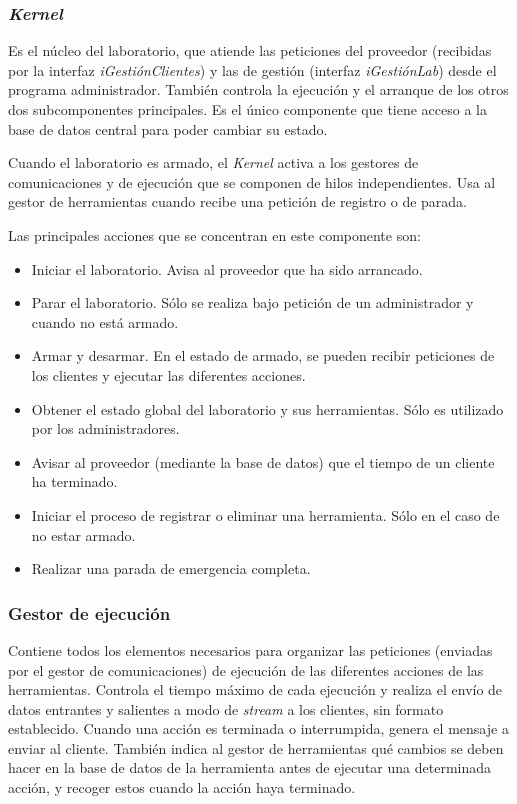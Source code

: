 \subsubsection{\emph{Kernel}}
Es el núcleo del laboratorio, que atiende las peticiones del proveedor 
(recibidas por la interfaz \emph{iGestiónClientes}) y las de gestión 
(interfaz \emph{iGestiónLab}) desde el programa administrador. 
También controla la ejecución y el arranque de los otros dos 
subcomponentes principales. Es el único componente que tiene acceso a 
la base de datos central para poder cambiar su estado.

Cuando el laboratorio es armado, el \emph{Kernel} activa a los 
gestores de comunicaciones y de ejecución que se componen de hilos 
independientes. Usa al gestor de herramientas cuando recibe una 
petición de registro o de parada.

Las principales acciones que se concentran en este componente son:
\begin{itemize}
\item Iniciar el laboratorio. Avisa al proveedor que ha sido arrancado.
\item Parar el laboratorio. Sólo se realiza bajo petición de un 
administrador y cuando no está armado.
\item Armar y desarmar. En el estado de armado, se pueden recibir 
peticiones de los clientes y ejecutar las diferentes acciones.
\item Obtener el estado global del laboratorio y sus herramientas. 
Sólo es utilizado por los administradores.
\item Avisar al proveedor (mediante la base de datos) que el tiempo de 
un cliente ha terminado.
\item Iniciar el proceso de registrar o eliminar una herramienta. Sólo 
en el caso de no estar armado.
\item Realizar una parada de emergencia completa.
\end{itemize}

\subsubsection{Gestor de ejecución}
Contiene todos los elementos necesarios para organizar las peticiones 
(enviadas por el gestor de comunicaciones) de ejecución de las 
diferentes acciones de las herramientas. Controla el tiempo máximo de 
cada ejecución y realiza el envío de datos entrantes y salientes a 
modo de \emph{stream} a los clientes, sin formato establecido. Cuando 
una acción es terminada o interrumpida, genera el mensaje a enviar al 
cliente. También indica al gestor de herramientas qué cambios se 
deben hacer en la base de datos de la herramienta
antes de ejecutar una determinada acción, y recoger estos cuando la 
acción haya terminado.

